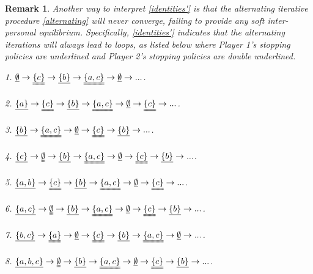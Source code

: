 \documentclass[11pt,reqno]{article}
\numberwithin{equation}{section}
\newtheorem{remark}{Remark}[section]
\begin{document}
\begin{remark}
Another way to interpret \eqref{identities'} is that the alternating iterative procedure \eqref{alternating} will never converge, failing to provide any soft inter-personal equilibrium. Specifically, \eqref{identities'} indicates that the alternating iterations will always lead to loops, as listed below where Player 1's stopping policies are underlined and Player 2's stopping policies are double underlined.
\vspace{0.05in}

1. $\uline{\emptyset}\to \uuline{\{c\}}\to\uline{\{b\}}\to\uuline{\{a,c\}}\to\uline{\emptyset}\to...$.

2. $\uline{\{a\}}\to\uuline{\{c\}}\to\uline{\{b\}}\to\uuline{\{a,c\}}\to\uline{\emptyset}\to\uuline{\{c\}}\to...$.

3. $\uline{\{b\}}\to\uuline{\{a,c\}}\to\uline{\emptyset}\to\uuline{\{c\}}\to\uline{\{b\}}\to...$.

4. $\uline{\{c\}}\to\uuline{\emptyset}\to\uline{\{b\}}\to\uuline{\{a,c\}}\to\uline{\emptyset}\to\uuline{\{c\}}\to\uline{\{b\}}\to...$.

5. $\uline{\{a,b\}}\to\uuline{\{c\}}\to\uline{\{b\}}\to\uuline{\{a,c\}}\to\uline{\emptyset}\to\uuline{\{c\}}\to...$.

6. $\uline{\{a,c\}}\to\uuline{\emptyset}\to\uline{\{b\}}\to\uuline{\{a,c\}}\to\uline{\emptyset}\to\uuline{\{c\}}\to\uline{\{b\}}\to...$.

7. $\uline{\{b,c\}}\to\uuline{\{a\}}\to\uline{\emptyset}\to\uuline{\{c\}}\to\uline{\{b\}}\to\uuline{\{a,c\}}\to\uline{\emptyset}\to...$.

8. $\uline{\{a,b,c\}}\to\uuline{\emptyset}\to\uline{\{b\}}\to\uuline{\{a,c\}}\to\uline{\emptyset}\to\uuline{\{c\}}\to\uline{\{b\}}\to...$.
\end{remark}
\end{document}
